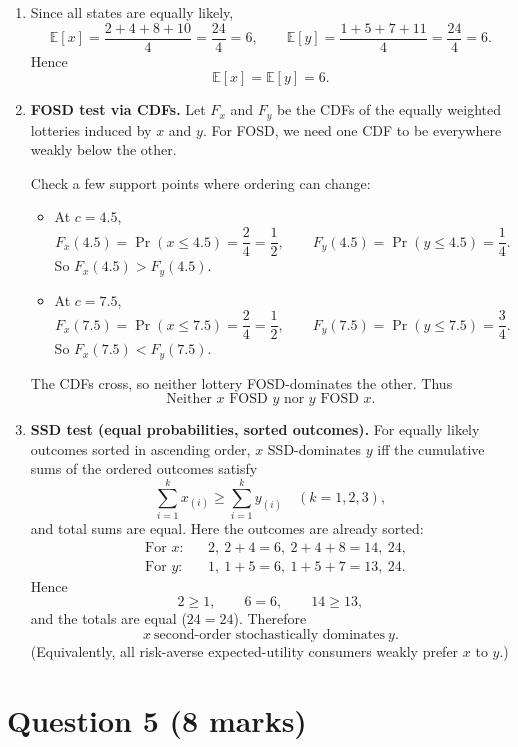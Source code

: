 \documentclass[12pt]{article}
\begin{document}
\begin{enumerate}[label=(\alph*)]
\item Since all states are equally likely,
\[
\mathbb E[x]=\frac{2+4+8+10}{4}=\frac{24}{4}=6,
\qquad
\mathbb E[y]=\frac{1+5+7+11}{4}=\frac{24}{4}=6.
\]
Hence
\[
\boxed{\mathbb E[x]=\mathbb E[y]=6.}
\]

\item \textbf{FOSD test via CDFs.}
Let $F_x$ and $F_y$ be the CDFs of the equally weighted lotteries induced by $x$ and $y$.
For FOSD, we need one CDF to be everywhere weakly below the other.

Check a few support points where ordering can change:
\begin{itemize}[leftmargin=*]
\item At $c=4.5$,
\[
F_x(4.5)=\Pr(x\le 4.5)=\frac{2}{4}=\frac12,
\qquad
F_y(4.5)=\Pr(y\le 4.5)=\frac{1}{4}.
\]
So $F_x(4.5)>F_y(4.5)$.

\item At $c=7.5$,
\[
F_x(7.5)=\Pr(x\le 7.5)=\frac{2}{4}=\frac12,
\qquad
F_y(7.5)=\Pr(y\le 7.5)=\frac{3}{4}.
\]
So $F_x(7.5)<F_y(7.5)$.
\end{itemize}
The CDFs cross, so neither lottery FOSD-dominates the other.
Thus
\[
\boxed{\text{Neither }x\text{ FOSD } y\text{ nor }y\text{ FOSD } x.}
\]

\item \textbf{SSD test (equal probabilities, sorted outcomes).}
For equally likely outcomes sorted in ascending order, $x$ SSD-dominates $y$ iff the cumulative sums of the ordered outcomes satisfy
\[
\sum_{i=1}^k x_{(i)} \ge \sum_{i=1}^k y_{(i)}\quad (k=1,2,3),
\]
and total sums are equal.
Here the outcomes are already sorted:
\[
\begin{aligned}
&\text{For }x: &&2,\ 2+4=6,\ 2+4+8=14,\ 24,\\
&\text{For }y: &&1,\ 1+5=6,\ 1+5+7=13,\ 24.
\end{aligned}
\]
Hence
\[
2\ge 1,\qquad 6=6,\qquad 14\ge 13,
\]
and the totals are equal ($24=24$). Therefore
\[
\boxed{x\ \text{second-order stochastically dominates}\ y.}
\]
(Equivalently, all risk-averse expected-utility consumers weakly prefer $x$ to $y$.)
\end{enumerate}

\bigskip

\section*{Question 5 (8 marks)}
\end{document}
